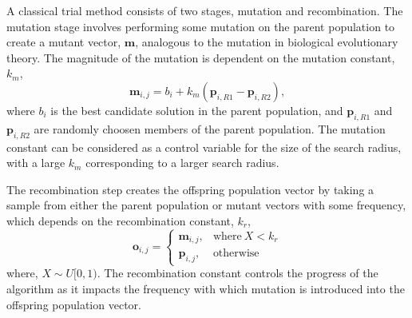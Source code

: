 A classical trial method consists of two stages, mutation and recombination.
The mutation stage involves performing some mutation on the parent population to create a mutant vector, $\mathbf{m}$, analogous to the mutation in biological evolutionary theory.
The magnitude of the mutation is dependent on the mutation constant, $k_m$,
%
\begin{equation}
\mathbf{m}_{i,j}= b_{i} + k_m(\mathbf{p}_{i,R1} - \mathbf{p}_{i,R2}),
\end{equation}
%
where $b_{i}$ is the best candidate solution in the parent population, and $\mathbf{p}_{i,R1}$ and $\mathbf{p}_{i,R2}$ are randomly choosen members of the parent population.
The mutation constant can be considered as a control variable for the size of the search radius, with a large $k_m$ corresponding to a larger search radius.

The recombination step creates the offspring population vector by taking a sample from either the parent population or mutant vectors with some frequency, which depends on the recombination constant, $k_r$,
%
\begin{equation}
    \mathbf{o}_{i,j} =
  \begin{cases}
    \mathbf{m}_{i,j}, & \text{where}\ X < k_r \\
    \mathbf{p}_{i,j}, & \text{otherwise}
  \end{cases}
\end{equation}
%
where, $X\sim U[0, 1)$.
The recombination constant controls the progress of the algorithm as it impacts the frequency with which mutation is introduced into the offspring population vector.

